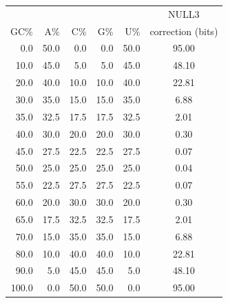 \begin{center}
\begin{tabular}{r|rrrr|c}
      &        &        &        &        & NULL3 \\ 
  GC\%&    A\% &   C\%  &   G\%  &    U\% & correction (bits)  \\ \hline
  0.0 &   50.0 &    0.0 &    0.0 &   50.0 &              95.00 \\
 10.0 &   45.0 &    5.0 &    5.0 &   45.0 &              48.10 \\
 20.0 &   40.0 &   10.0 &   10.0 &   40.0 &              22.81 \\
 30.0 &   35.0 &   15.0 &   15.0 &   35.0 &               6.88 \\
 35.0 &   32.5 &   17.5 &   17.5 &   32.5 &               2.01 \\
 40.0 &   30.0 &   20.0 &   20.0 &   30.0 &               0.30 \\
 45.0 &   27.5 &   22.5 &   22.5 &   27.5 &               0.07 \\
 50.0 &   25.0 &   25.0 &   25.0 &   25.0 &               0.04 \\
 55.0 &   22.5 &   27.5 &   27.5 &   22.5 &               0.07 \\
 60.0 &   20.0 &   30.0 &   30.0 &   20.0 &               0.30 \\
 65.0 &   17.5 &   32.5 &   32.5 &   17.5 &               2.01 \\
 70.0 &   15.0 &   35.0 &   35.0 &   15.0 &               6.88 \\
 80.0 &   10.0 &   40.0 &   40.0 &   10.0 &              22.81 \\
 90.0 &    5.0 &   45.0 &   45.0 &    5.0 &              48.10 \\
100.0 &    0.0 &   50.0 &   50.0 &    0.0 &              95.00 \\

\end{tabular}
\end{center}

\vspace{0.5in}


